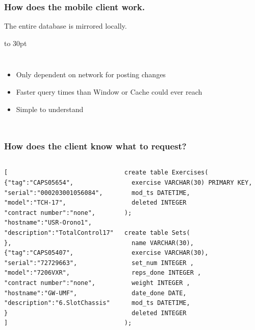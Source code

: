 \documentclass[]{beamer}
\begin{document}
\begin{frame}
\frametitle{How does the mobile client work.}


The entire database is mirrored locally.

\vbox to 30pt{}
\begin{columns}[c]
\column{2in}

\begin{itemize}
\item Only dependent on network for posting changes
\item Faster query times than Window or Cache could ever reach
\item Simple to understand
\end{itemize}

\column{2in}
\end{columns}


\end{frame}



\begin{frame}[fragile]
\frametitle{How does the client know what to request?}


\begin{columns}[c]
\column{2in}
\begin{lstlisting}
[
{"tag":"CAPS05654",
"serial":"000203001056084",
"model":"TCH-17",
"contract number":"none",
"hostname":"USR-Orono1",
"description":"TotalControl17"
},
{"tag":"CAPS05407",
"serial":"72729663",
"model":"7206VXR",
"contract number":"none",
"hostname":"GW-UMF",
"description":"6.SlotChassis"
}
]
\end{lstlisting}
\column{2in}

\begin{lstlisting}
create table Exercises(
  exercise VARCHAR(30) PRIMARY KEY,
  mod_ts DATETIME, 
  deleted INTEGER  
);

create table Sets(
  name VARCHAR(30),
  exercise VARCHAR(30),
  set_num INTEGER ,
  reps_done INTEGER ,
  weight INTEGER ,
  date_done DATE,
  mod_ts DATETIME, 
  deleted INTEGER 
);

\end{lstlisting}

\end{columns}

\end{frame}
\end{document}
